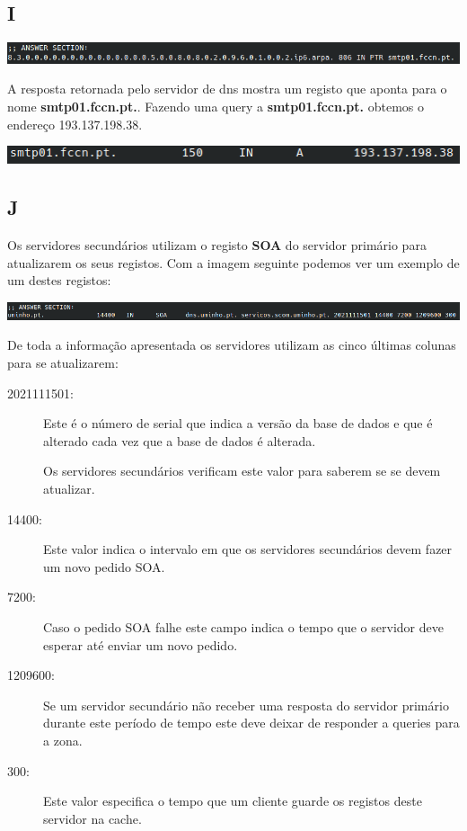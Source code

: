 \documentclass{report}
\begin{document}
        \subsection*{I}
            \noindent
            \includegraphics[width=\textwidth]{images/dig_ipv6.png}
            \par
            A resposta retornada pelo servidor de dns mostra um registo que aponta para o nome \textbf{smtp01.fccn.pt.}.
            Fazendo uma query a \textbf{smtp01.fccn.pt.} obtemos o endereço 193.137.198.38.
            \par
            \noindent
            \includegraphics[width=\textwidth]{images/dig_smtp01.png}
            \par
        \subsection*{J}
            Os servidores secundários utilizam o registo \textbf{SOA} do servidor primário para atualizarem os seus registos. 
            Com a imagem seguinte podemos ver um exemplo de um destes registos: 
            \vspace{0.45em}
            \par
            \noindent
            \includegraphics[width=\textwidth]{images/uminho_soa.png}
            \par
            \vspace{0.45em}
            De toda a informação apresentada os servidores utilizam as cinco últimas colunas para se atualizarem:
            \begin{description}
                \item[2021111501:] Este é o número de serial que indica a versão da base de dados e que é alterado cada vez que a base de dados é alterada. 
                \par Os servidores secundários verificam este valor para saberem se se devem atualizar.
                \item[14400:] Este valor indica o intervalo em que os servidores secundários devem fazer um novo pedido SOA.
                \item[7200:] Caso o pedido SOA falhe este campo indica o tempo que o servidor deve esperar até enviar um novo pedido.
                \item[1209600:] Se um servidor secundário não receber uma resposta do servidor primário durante este período de tempo este deve deixar de responder a queries para a zona.
                \item[300:] Este valor especifica o tempo que um cliente guarde os registos deste servidor na cache. 
            \end{description}
\end{document}

